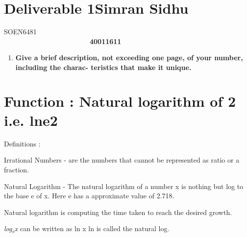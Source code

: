 \documentclass[12pt]{article}
\begin{document}
\section*{Deliverable 1\hspace*{10pt}Simran Sidhu}
SOEN6481\ \ \ \ \ \ \ \ \ \ \ \ \ \ \ \ \ \ \ \ \ \ \ \ \ \ \ \ \ \ \ \ \ \ \ \ \ \ \ \ \ \ \ \ \ \ \ \ \ \ \ \ \ \ \ \ \ \ \ \ \ \ \ \ \ \ \ \ \ \ \ \ \ \ \ \ \ \ \ \ \ \ \ \ \ \ \  \textbf{40011611}\par


\vspace{\baselineskip}

\vspace{\baselineskip}
\begin{enumerate}
	\item \textbf{Give a brief description, not exceeding one page, of your number, including the charac- teristics that make it unique.}
\end{enumerate}\par

\section*{Function : Natural logarithm of 2 i.e. lne2}
Definitions :\par

Irrational Numbers - are the numbers that cannot be represented as ratio or a fraction.\par


\vspace{\baselineskip}
\begin{adjustwidth}{0.0in}{0.47in}
Natural Logarithm - The natural logarithm of a number x is nothing but log to the base e of x. Here e has a approximate value of 2.718.\par

\end{adjustwidth}

Natural logarithm is computing the time taken to reach the desired growth.\par

\begin{adjustwidth}{0.0in}{3.51in}
\textit{log\textsubscript{e}x }can be written as ln x ln is called the natural log.\par

\end{adjustwidth}
\end{document}
